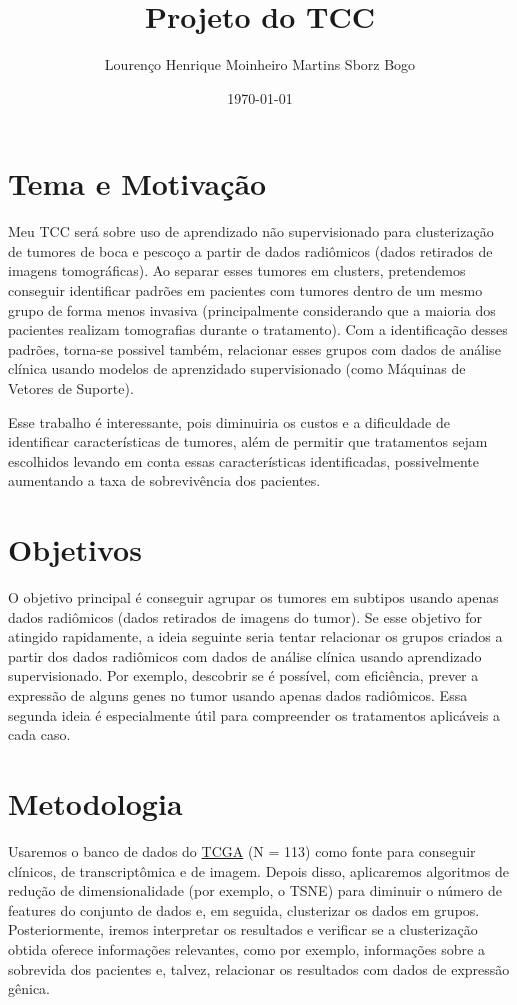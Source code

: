 \documentclass[11pt]{article}
\author{Lourenço Henrique Moinheiro Martins Sborz Bogo}
\date{\today}
\title{Projeto do TCC}
\begin{document}
\maketitle

\section{Tema e Motivação}
\label{sec:org4a7d76c}

Meu TCC será sobre uso de aprendizado não supervisionado para clusterização de tumores de boca e pescoço a partir de dados radiômicos (dados retirados de imagens tomográficas). 
Ao separar esses tumores em clusters, pretendemos conseguir identificar padrões em pacientes com tumores dentro de um mesmo grupo de forma menos invasiva (principalmente considerando que a maioria dos pacientes realizam tomografias durante o tratamento). Com a identificação desses padrões, torna-se possivel também, relacionar esses grupos com dados de análise clínica usando modelos de aprenzidado supervisionado (como Máquinas de Vetores de Suporte).

Esse trabalho é interessante, pois diminuiria os custos e a dificuldade de identificar características de tumores, além de permitir que tratamentos sejam escolhidos levando em conta essas características identificadas, possivelmente aumentando a taxa de sobrevivência dos pacientes.

\section{Objetivos}
\label{sec:org0a60572}

O objetivo principal é conseguir agrupar os tumores em subtipos usando apenas dados radiômicos (dados retirados de imagens do tumor). Se esse objetivo for atingido rapidamente, a ideia seguinte seria tentar relacionar os grupos criados a partir dos dados radiômicos com dados de análise clínica usando aprendizado supervisionado. Por exemplo, descobrir se é possível, com eficiência, prever a expressão de alguns genes no tumor usando apenas dados radiômicos. Essa segunda ideia é especialmente útil para compreender os tratamentos aplicáveis a cada caso.

\section{Metodologia}
\label{sec:org3ff56f7}

Usaremos o banco de dados do \href{https://www.cancer.gov/about-nci/organization/ccg/research/structural-genomics/tcga}{TCGA} (N = 113) como fonte para conseguir clínicos, de transcriptômica e de imagem. Depois disso, aplicaremos algoritmos de redução de dimensionalidade (por exemplo, o TSNE) para diminuir o número de features do conjunto de dados e, em seguida, clusterizar os dados em grupos. Posteriormente, iremos interpretar os resultados e verificar se a clusterização obtida oferece informações relevantes, como por exemplo, informações sobre a sobrevida dos pacientes e, talvez, relacionar os resultados com dados de expressão gênica.
\end{document}
